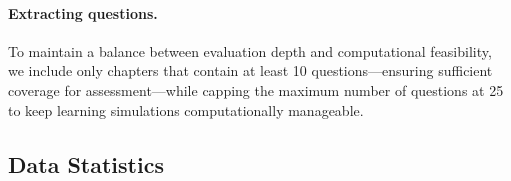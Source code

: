 \paragraph{Extracting questions.}
To maintain a balance between evaluation depth and computational feasibility, we include only chapters that contain at least 10 questions—ensuring sufficient coverage for assessment—while capping the maximum number of questions at 25 to keep learning simulations computationally manageable.

\subsection{Data Statistics}
\label{ssec:textbook-exam-statistics}
\begin{table}[t!]
    \centering
    \caption{\textbf{Data Statistics} of \ourdata. \# $ C$: number of chapters, \# $E/C$: avg. number of questions per chapter, \% $E$ w/ answer: proportion of questions that have reference answer, \# $S/C$: avg. number of sections per chapter.}
    \label{tab:textbook-exam-statistics}
\end{table}
